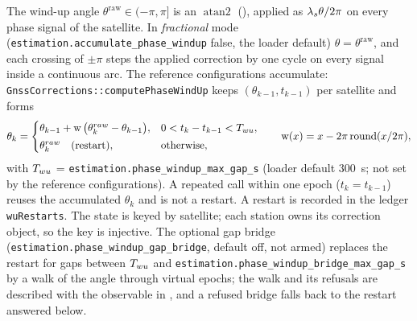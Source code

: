 \documentclass[main.tex]{subfiles}
\begin{document}
The wind-up angle $\theta^{\mathrm{raw}} \in (-\pi,\pi]$ is an
$\operatorname{atan2}$ (), applied as $\lambda_s\theta/2\pi$
on every phase signal of the satellite. In \emph{fractional} mode
(\texttt{estimation.accumulate\_phase\_windup} false, the loader default)
$\theta = \theta^{\mathrm{raw}}$, and each crossing of $\pm\pi$ steps the
applied correction by one cycle on every signal inside a continuous arc.
The reference configurations accumulate:
\texttt{GnssCorrections::computePhaseWindUp} keeps $(\theta_{k-1}, t_{k-1})$
per satellite and forms
\begin{equation}
\theta_k =
\begin{cases}
\theta_{k-1} + \operatorname{w}\big(\theta^{raw}_k - \theta_{k-1}\big), & 0 < t_k - t_{k-1} < T_{wu},\\[2pt]
\theta^{raw}_k \quad \text{(restart)}, & \text{otherwise},
\end{cases}
\qquad \operatorname{w}(x) = x - 2\pi \operatorname{round}(x/2\pi),
\label{eq:wire-unwrap}
\end{equation}
with $T_{wu}$ = \texttt{estimation.phase\_windup\_max\_gap\_s}
(loader default \SI{300}{s}; not set by the reference configurations). A
repeated call within one epoch ($t_k = t_{k-1}$) reuses the accumulated
$\theta_k$ and is not a restart. A restart is recorded in the ledger
\texttt{wuRestarts}. The state is keyed by satellite; each station owns its
correction object, so the key is injective. The optional gap bridge
(\texttt{estimation.phase\_windup\_gap\_bridge}, default off, not armed)
replaces the restart for gaps between $T_{wu}$ and
\texttt{estimation.phase\_windup\_bridge\_max\_gap\_s} by a walk of the angle
through virtual epochs; the walk and its refusals are described with the
observable in , and a refused bridge falls back to the
restart answered below.
\end{document}
